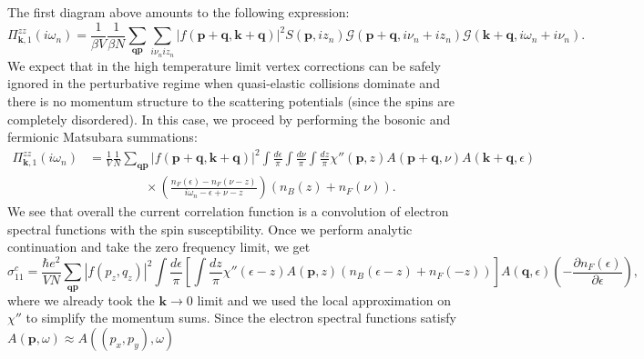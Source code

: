 \documentclass[aps,prl,twocolumn,superscriptaddress,amsmath,nofootinbib,10pt,floatfix]{revtex4-2}
\def \nn {\nonumber}
\begin{document}
\begin{widetext}
The first diagram above amounts to the following expression:
\begin{equation}
\Pi_{\boldsymbol{k},1}^{zz}\left(i\omega_{n}\right)=\frac{1}{\beta V}\frac{1}{\beta N}\sum_{\boldsymbol{q}\boldsymbol{p}}\sum_{i\nu_{n}iz_{n}}\left|f\left(\boldsymbol{p}+\boldsymbol{q},\boldsymbol{k}+\boldsymbol{q}\right)\right|^{2}S\left(\boldsymbol{p},iz_{n}\right)\mathcal{G}\left(\boldsymbol{p}+\boldsymbol{q},i\nu_{n}+iz_{n}\right)\mathcal{G}\left(\boldsymbol{k}+\boldsymbol{q},i\omega_{n}+i\nu_{n}\right).
\end{equation}
We expect that in the high temperature limit vertex corrections
can be safely ignored in the perturbative regime when quasi-elastic
collisions dominate and there is no momentum structure to the scattering
potentials (since the spins are completely disordered). In this case, we proceed by performing the bosonic and fermionic Matsubara summations:
\begin{align}
\Pi_{\boldsymbol{k},1}^{zz}\left(i\omega_{n}\right) & =\frac{1}{V}\frac{1}{N}\sum_{\boldsymbol{q}\boldsymbol{p}}\left|f\left(\boldsymbol{p}+\boldsymbol{q},\boldsymbol{k}+\boldsymbol{q}\right)\right|^{2}\int\frac{d\epsilon}{\pi}\int\frac{d\nu}{\pi}\int\frac{dz}{\pi}\chi''\left(\boldsymbol{p},z\right)A\left(\boldsymbol{p}+\boldsymbol{q},\nu\right)A\left(\boldsymbol{k}+\boldsymbol{q},\epsilon\right) \nn \\
 & \ \ \ \ \ \ \ \ \ \ \ \ \ \ \ \ \ \ \ \ \times\left(\frac{n_{F}\left(\epsilon\right)-n_{F}\left(\nu-z\right)}{i\omega_{n}-\epsilon+\nu-z}\right)\left(n_{B}\left(z\right)+n_{F}\left(\nu\right)\right).
\end{align}
We see that overall the current correlation function is a convolution
of electron spectral functions with the spin susceptibility. Once
we perform analytic continuation and take the zero frequency limit,
we get 
\begin{equation}
\sigma_{11}^{c}=\frac{\hbar e^{2}}{VN}\sum_{\boldsymbol{q}\boldsymbol{p}}\left|f\left(p_{z},q_{z}\right)\right|^{2}\int\frac{d\epsilon}{\pi}\left[\int\frac{dz}{\pi}\chi''\left(\epsilon-z\right)A\left(\boldsymbol{p},z\right)\left(n_{B}\left(\epsilon-z\right)+n_{F}\left(-z\right)\right)\right]A\left(\boldsymbol{q},\epsilon\right)\left(-\frac{\partial n_{F}\left(\epsilon\right)}{\partial\epsilon}\right),
\end{equation}
where we already took the $\boldsymbol{k}\rightarrow0$ limit and
we used the local approximation on $\chi''$ to simplify the momentum
sums. Since the electron spectral functions satisfy $A\left(\boldsymbol{p},\omega\right)\approx A\left(\left(p_{x},p_{y}\right),\omega\right)$

\end{widetext}
\end{document}
